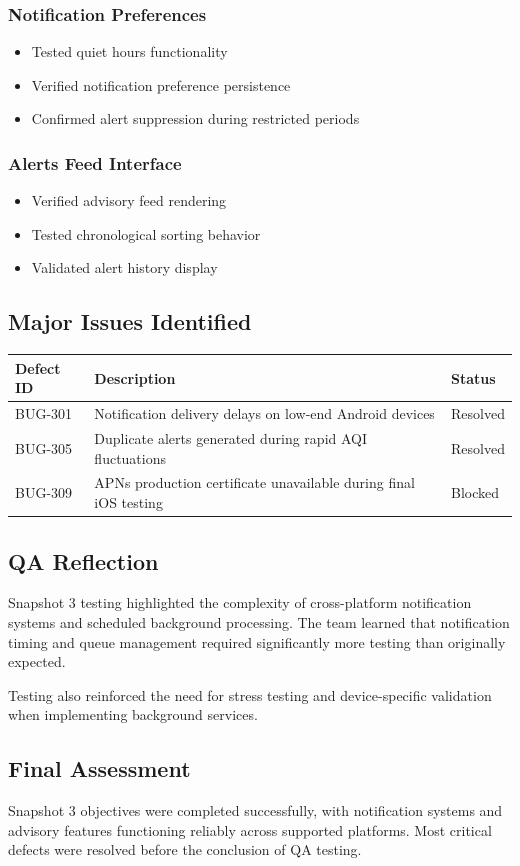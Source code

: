 \subsubsection{Notification Preferences}
\begin{itemize}
    \item Tested quiet hours functionality
    \item Verified notification preference persistence
    \item Confirmed alert suppression during restricted periods
\end{itemize}

\subsubsection{Alerts Feed Interface}
\begin{itemize}
    \item Verified advisory feed rendering
    \item Tested chronological sorting behavior
    \item Validated alert history display
\end{itemize}

\subsection{Major Issues Identified}

\begin{table}[h]
\centering
\begin{tabular}{|l|p{9cm}|l|}
\hline
\textbf{Defect ID} & \textbf{Description} & \textbf{Status} \\
\hline
BUG-301 & Notification delivery delays on low-end Android devices & Resolved \\
\hline
BUG-305 & Duplicate alerts generated during rapid AQI fluctuations & Resolved \\
\hline
BUG-309 & APNs production certificate unavailable during final iOS testing & Blocked \\
\hline
\end{tabular}
\end{table}

\subsection{QA Reflection}

Snapshot 3 testing highlighted the complexity of cross-platform notification systems and scheduled background processing. The team learned that notification timing and queue management required significantly more testing than originally expected.

Testing also reinforced the need for stress testing and device-specific validation when implementing background services.

\subsection{Final Assessment}

Snapshot 3 objectives were completed successfully, with notification systems and advisory features functioning reliably across supported platforms. Most critical defects were resolved before the conclusion of QA testing.
